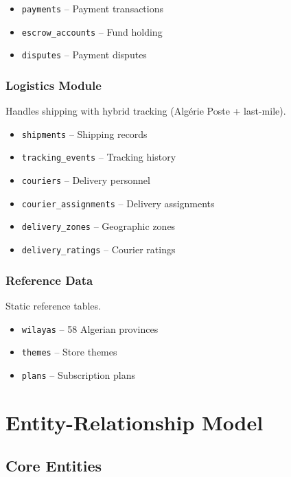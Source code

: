 \documentclass[12pt,a4paper]{report}
\begin{document}
\begin{itemize}
    \item \texttt{payments} -- Payment transactions
    \item \texttt{escrow\_accounts} -- Fund holding
    \item \texttt{disputes} -- Payment disputes
\end{itemize}

\subsection{Logistics Module}
Handles shipping with hybrid tracking (Algérie Poste + last-mile).

\begin{itemize}
    \item \texttt{shipments} -- Shipping records
    \item \texttt{tracking\_events} -- Tracking history
    \item \texttt{couriers} -- Delivery personnel
    \item \texttt{courier\_assignments} -- Delivery assignments
    \item \texttt{delivery\_zones} -- Geographic zones
    \item \texttt{delivery\_ratings} -- Courier ratings
\end{itemize}

\subsection{Reference Data}
Static reference tables.

\begin{itemize}
    \item \texttt{wilayas} -- 58 Algerian provinces
    \item \texttt{themes} -- Store themes
    \item \texttt{plans} -- Subscription plans
\end{itemize}

\chapter{Entity-Relationship Model}

\section{Core Entities}
\end{document}
